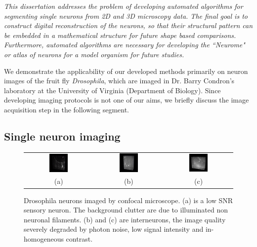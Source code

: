 \textit{This dissertation addresses the problem of developing automated algorithms for segmenting single neurons from 2D and 3D microscopy data. The final goal is to construct digital reconstruction of the neurons, so that their structural pattern can be embedded in a mathematical structure for future shape based comparisons. Furthermore, automated algorithms are necessary for developing the ``Neurome" or atlas of neurons for a model organism for future studies.}

We demonstrate the applicability of our developed methods primarily on  neuron images of  the fruit fly \textit{Drosophila}, which are imaged in Dr. Barry Condron's laboratory at the University of Virginia (Department of Biology). Since developing imaging protocols is not one of our aims, we briefly discuss the image acquisition step in the following segment.

\subsection{Single neuron imaging}

\begin{figure}[t]
\centering
\setlength{\tabcolsep}{0.1 cm}
\begin{tabular}{ccc}
\includegraphics[width=0.29\textwidth]{images/lowSNR_1}	&
\includegraphics[width=0.29\textwidth]{images/lowSNR_2}	&
\includegraphics[width=0.29\textwidth]{images/lowSNR_3} \\
\scriptsize(a) & \scriptsize(b) & \scriptsize(c)
\end{tabular}
\caption[3D neuron example]{Drosophila neurons imaged by confocal microscope. (a) is a low SNR sensory neuron. The background clutter are due
to illuminated non neuronal filaments. (b) and (c) are interneurons, the image quality severely degraded by photon noise, low signal
intensity and in-homogeneous contrast.}
\label{fig:neuron_stack}
\end{figure}

